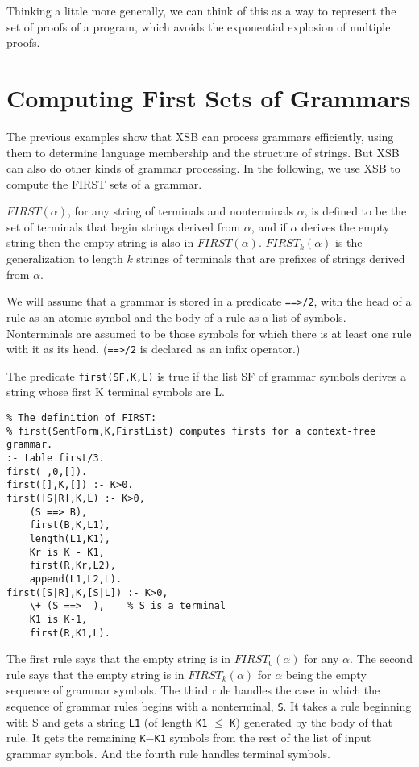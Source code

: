 Thinking a little more generally, we can think of this as a way to
represent the set of proofs of a program, which avoids the exponential
explosion of multiple proofs.

\section{Computing First Sets of Grammars}

The previous examples show that XSB can process grammars efficiently,
using them to determine language membership and the structure of
strings.  But XSB can also do other kinds of grammar processing.  In
the following, we use XSB to compute the FIRST sets of a grammar.

$FIRST(\alpha)$, for any string of terminals and nonterminals
$\alpha$, is defined to be the set of terminals that begin strings
derived from $\alpha$, and if $\alpha$ derives the empty string then
the empty string is also in $FIRST(\alpha)$.  $FIRST_k(\alpha)$ is the
generalization to length $k$ strings of terminals that are prefixes of
strings derived from $\alpha$.

We will assume that a grammar is stored in a predicate
\verb|==>/2|, with the head of a rule as an atomic symbol and the body
of a rule as a list of symbols.  Nonterminals are assumed to be those
symbols for which there is at least one rule with it as its head.
(\verb|==>/2| is declared as an infix operator.)

The predicate \verb|first(SF,K,L)| is true if the list SF of grammar
symbols derives a string whose first K terminal symbols are L.

\begin{verbatim}
% The definition of FIRST:
% first(SentForm,K,FirstList) computes firsts for a context-free grammar.
:- table first/3.
first(_,0,[]).
first([],K,[]) :- K>0.
first([S|R],K,L) :- K>0,
    (S ==> B),
    first(B,K,L1),
    length(L1,K1),
    Kr is K - K1,
    first(R,Kr,L2),
    append(L1,L2,L).
first([S|R],K,[S|L]) :- K>0,
    \+ (S ==> _),    % S is a terminal
    K1 is K-1,
    first(R,K1,L).
\end{verbatim}

The first rule says that the empty string is in $FIRST_0(\alpha)$ for
any $\alpha$.  The second rule says that the empty string is in
$FIRST_k(\alpha)$ for $\alpha$ being the empty sequence of grammar
symbols.  The third rule handles the case in which the sequence of
grammar rules begins with a nonterminal, \verb|S|.  It takes a rule
beginning with S and gets a string \verb|L1| (of length \verb|K1|
$\leq$ \verb|K|) generated by the body of that rule.  It gets the
remaining \verb|K|$-$\verb|K1| symbols from the rest of the list of
input grammar symbols.  And the fourth rule handles terminal symbols.

